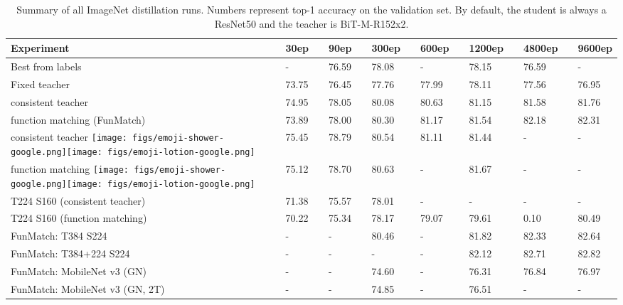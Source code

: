 \documentclass[10pt,twocolumn,letterpaper]{article}
\def \shampoo {\texttt{[image: figs/emoji-shower-google.png]}\texttt{[image: figs/emoji-lotion-google.png]}\xspace}
\begin{document}
\begin{table*}[t]
  \setlength{\tabcolsep}{0pt}
  \setlength{\extrarowheight}{5pt}
  \renewcommand{\arraystretch}{0.75}
  \centering
  \vspace{-2em}
  \caption{Summary of all ImageNet distillation runs. Numbers represent top-1 accuracy on the validation set. By default, the student is always a ResNet50 and the teacher is BiT-M-R152x2.}\label{tbl:models}
\begin{tabularx}{\linewidth}{p{5.4cm}p{0.1cm}Cp{0.01cm}Cp{0.01cm}Cp{0.01cm}Cp{0.01cm}Cp{0.01cm}Cp{0.01cm}C}
    \toprule[1pt]
    \bf{Experiment} && \bf{30ep} && \bf{90ep} && \bf{300ep} && \bf{600ep} && \bf{1200ep} && \bf{4800ep} && \bf{9600ep} \\
    \midrule
Best from labels     &&   -   && 76.59 && 78.08 &&   -   && 78.15 && 76.59 &&   -   \\
Fixed teacher        && 73.75 && 76.45 && 77.76 && 77.99 && 78.11 && 77.56 && 76.95 \\
consistent teacher   && 74.95 && 78.05 && 80.08 && 80.63 && 81.15 && 81.58 && 81.76 \\
function matching (FunMatch) && 73.89 && 78.00 && 80.30 && 81.17 && 81.54 && 82.18 && 82.31 \\
    \midrule
consistent teacher \shampoo     && 75.45 && 78.79 && 80.54 && 81.11 && 81.44 &&   -   &&   -   \\
function matching \shampoo       && 75.12 && 78.70 && 80.63 &&   -   && 81.67 &&   -   &&   -   \\
    \midrule
T224  S160 (consistent teacher)  && 71.38 && 75.57 && 78.01 &&   -   &&   -   &&   -   &&   -   \\
T224  S160 (function matching)   && 70.22 && 75.34 && 78.17 && 79.07 && 79.61 &&  0.10 && 80.49 \\
    \midrule[0.25pt]
FunMatch: T384  S224          &&   -   &&   -   && 80.46 &&   -   && 81.82 && 82.33 && 82.64 \\
    \midrule[0.25pt]
FunMatch: T384+224  S224      &&   -   &&   -   &&   -   &&   -   && 82.12 && 82.71 && 82.82 \\
\midrule
FunMatch: MobileNet v3 (GN)    &&   -   &&   -   && 74.60 &&   -   && 76.31 && 76.84 && 76.97 \\
FunMatch: MobileNet v3 (GN, 2T) &&   -   &&   -   && 74.85 &&   -   && 76.51 &&   -   &&   -   \\

\end{tabularx}
\end{table*}
\end{document}
